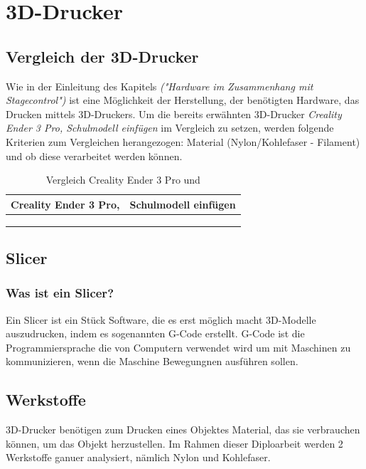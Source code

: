 \section{3D-Drucker}

\subsection{Vergleich der 3D-Drucker}
Wie in der Einleitung des Kapitels \emph{("Hardware im Zusammenhang mit Stagecontrol")} ist eine Möglichkeit der Herstellung, der benötigten Hardware, das Drucken mittels 3D-Druckers. Um die bereits erwähnten 3D-Drucker \emph{Creality Ender 3 Pro, Schulmodell einfügen} im Vergleich zu setzen, werden folgende Kriterien zum Vergleichen herangezogen: Material (Nylon/Kohlefaser - Filament) und ob diese verarbeitet werden können.

\begin{table} [H]
	\begin{tabular}{ |p{5.5cm}|p{5.5cm}| }
		\hline
		\textbf{Creality Ender 3 Pro,}& \textbf{Schulmodell einfügen}\\
		\hline
		 &   \\ 
		 &   \\  
		 &  \\  
		\hline
	\end{tabular}
	\caption{Vergleich Creality Ender 3 Pro und }
\end{table}

\subsection{Slicer}
\subsubsection{Was ist ein Slicer?}
Ein Slicer ist ein Stück Software, die es erst möglich macht 3D-Modelle auszudrucken, indem es sogenannten G-Code erstellt. G-Code ist die Programmiersprache die von Computern verwendet wird um mit Maschinen zu kommunizieren, wenn die Maschine Bewegungnen ausführen sollen. \cite{Slicer_G-Code}

\subsection{Werkstoffe}
3D-Drucker benötigen zum Drucken eines Objektes Material, das sie verbrauchen können, um das Objekt herzustellen. Im Rahmen dieser Diploarbeit werden 2 Werkstoffe ganuer analysiert, nämlich Nylon und Kohlefaser.

